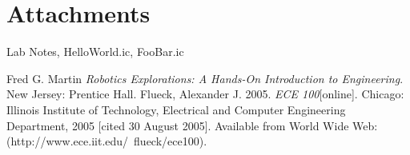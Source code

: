 \documentclass[a4paper, 11pt]{article}
\begin{document}
\ifx

\section*{Attachments}
Lab Notes, HelloWorld.ic, FooBar.ic

\begin{thebibliography}{9}
 Fred G. Martin \emph{Robotics Explorations: A Hands-On Introduction to Engineering}. New Jersey: Prentice Hall.
  Flueck, Alexander J. 2005. \emph{ECE 100}[online]. Chicago: Illinois Institute of Technology, Electrical and Computer Engineering Department, 2005 [cited 30
August 2005]. Available from World Wide Web: (http://www.ece.iit.edu/~flueck/ece100).
\end{thebibliography}
\fi
\end{document}
